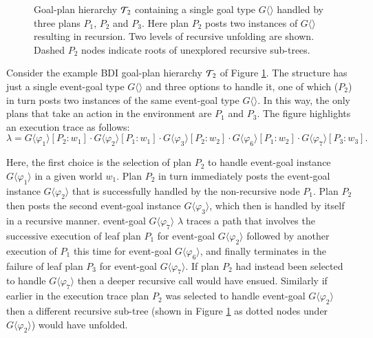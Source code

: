 \begin{figure}[t]
\begin{center}
\resizebox{0.8\textwidth}{!}{

}
\end{center}
\caption{Goal-plan hierarchy ${\mathcal{T}}_2$ containing a single goal type $G\langle\rangle$ handled by three plans $P_1$, $P_2$ and $P_3$. Here plan $P_2$ posts two instances of $G\langle\rangle$ resulting in recursion. Two levels of recursive unfolding are shown. Dashed $P_2$ nodes indicate roots of unexplored recursive sub-trees.}
\label{fig:unfolding}
\end{figure}

Consider the example BDI goal-plan hierarchy ${\mathcal{T}}_2$ of Figure \ref{fig:unfolding}. The structure has just a single event-goal type $G\langle\rangle$ and three options to handle it, one of which ($P_2$) in turn posts two instances of the same event-goal type $G\langle\rangle$. In this way, the only plans that take an action in the environment are $P_1$ and $P_3$. The figure highlights an execution trace as follows: \[
\lambda=G\langle\varphi_1\rangle[P_2:w_1] \cdot G\langle\varphi_2\rangle[P_1:w_1] \cdot G\langle\varphi_3\rangle[P_2:w_2] \cdot G\langle\varphi_6\rangle[P_1:w_2] \cdot G\langle\varphi_7\rangle[P_3:w_3].
\]

Here, the first choice is the selection of plan $P_2$ to handle event-goal instance $G\langle\varphi_1\rangle$ in a given world $w_1$. Plan $P_2$ in turn immediately posts the event-goal instance $G\langle\varphi_2\rangle$ that is successfully handled by the non-recursive node $P_1$. Plan $P_2$ then posts the second event-goal instance $G\langle\varphi_3\rangle$, which then is handled by itself in a recursive manner.  event-goal $G\langle\varphi_7\rangle$
$\lambda$ traces a path that involves the successive execution of leaf plan $P_1$ for event-goal $G\langle\varphi_2\rangle$ followed by another execution of $P_1$ this time for event-goal $G\langle\varphi_6\rangle$, and finally terminates in the failure of leaf plan $P_3$ for event-goal $G\langle\varphi_7\rangle$. If plan $P_2$ had instead been selected to handle $G\langle\varphi_7\rangle$ then a deeper recursive call would have ensued. Similarly if earlier in the execution trace plan $P_2$ was selected to handle event-goal $G\langle\varphi_2\rangle$ then a different recursive sub-tree (shown in Figure \ref{fig:unfolding} as dotted nodes under $G\langle\varphi_2\rangle$) would have unfolded.

